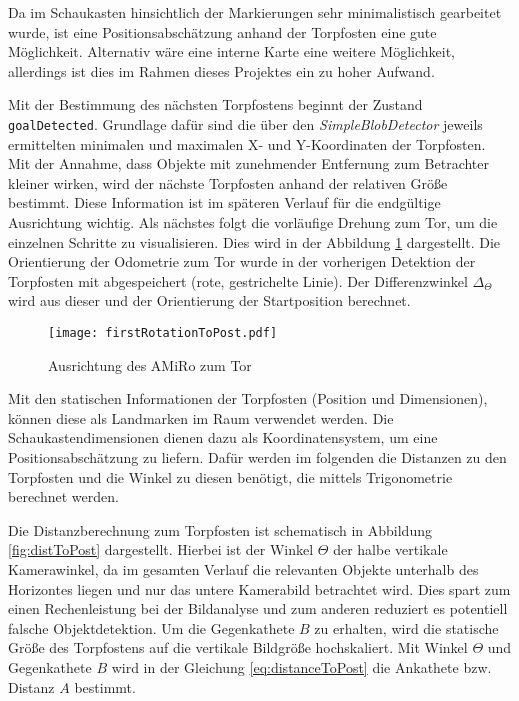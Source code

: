 Da im Schaukasten hinsichtlich der Markierungen sehr minimalistisch gearbeitet wurde, ist eine Positionsabschätzung anhand der Torpfosten eine gute Möglichkeit. Alternativ wäre eine interne Karte eine weitere Möglichkeit, allerdings ist dies im Rahmen dieses Projektes ein zu hoher Aufwand.

Mit der Bestimmung des nächsten Torpfostens beginnt der Zustand \texttt{goalDetected}. Grundlage dafür sind die über den \textit{SimpleBlobDetector} jeweils ermittelten minimalen und maximalen X- und Y-Koordinaten der Torpfosten. Mit der Annahme, dass Objekte mit zunehmender Entfernung zum Betrachter kleiner wirken, wird der nächste Torpfosten anhand der relativen Größe bestimmt. Diese Information ist im späteren Verlauf für die endgültige Ausrichtung wichtig. Als nächstes folgt die vorläufige Drehung zum Tor, um die einzelnen Schritte zu visualisieren. Dies wird in der Abbildung \ref{fig:firstRotationToPost} dargestellt. Die Orientierung der Odometrie zum Tor wurde in der vorherigen Detektion der Torpfosten mit abgespeichert (rote, gestrichelte Linie). Der Differenzwinkel $\Delta_\Theta$ wird aus dieser und der Orientierung der Startposition berechnet.

\begin{figure}[h]
	\begin{center}
		\texttt{[image: firstRotationToPost.pdf]} 	
		\caption{Ausrichtung des AMiRo zum Tor}
		\label{fig:firstRotationToPost}
	\end{center}
\end{figure}

Mit den statischen Informationen der Torpfosten (Position und Dimensionen), können diese als Landmarken im Raum verwendet werden. Die Schaukastendimensionen dienen dazu als Koordinatensystem, um eine Positionsabschätzung zu liefern. Dafür werden im folgenden die Distanzen zu den Torpfosten und die Winkel zu diesen benötigt, die mittels Trigonometrie berechnet werden.

Die Distanzberechnung zum Torpfosten ist schematisch in Abbildung \ref{fig:distToPost} dargestellt. Hierbei ist der Winkel $\Theta$ der halbe vertikale Kamerawinkel, da im gesamten Verlauf die relevanten Objekte unterhalb des Horizontes liegen und nur das untere Kamerabild betrachtet wird. Dies spart zum einen Rechenleistung bei der Bildanalyse und zum anderen reduziert es potentiell falsche Objektdetektion. Um die Gegenkathete $B$ zu erhalten, wird die statische Größe des Torpfostens auf die vertikale Bildgröße hochskaliert. Mit Winkel $\Theta$ und Gegenkathete $B$ wird in der Gleichung \ref{eq:distanceToPost} die Ankathete bzw. Distanz $A$ bestimmt.

